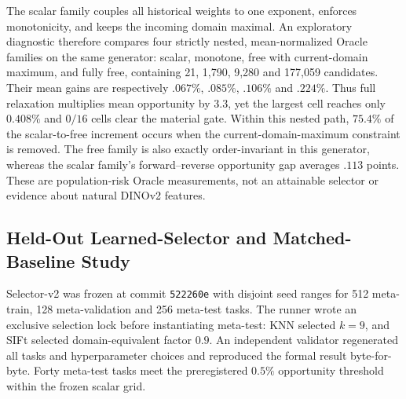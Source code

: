 \documentclass[10pt]{article}
\begin{document}
The scalar family couples all historical weights to one exponent, enforces
monotonicity, and keeps the incoming domain maximal.  An exploratory diagnostic
therefore compares four strictly nested, mean-normalized Oracle families on
the same generator: scalar, monotone, free with current-domain maximum, and
fully free, containing 21, 1{,}790, 9{,}280 and 177{,}059 candidates.  Their
mean gains are respectively $.067\%$, $.085\%$, $.106\%$ and $.224\%$.  Thus
full relaxation multiplies mean opportunity by $3.3$, yet
the largest cell reaches only $0.408\%$ and $0/16$ cells clear the material
gate.  Within this nested path, $75.4\%$ of the scalar-to-free increment occurs
when the current-domain-maximum constraint is removed.  The free family is
also exactly order-invariant in this generator, whereas the scalar family's
forward--reverse opportunity gap averages $.113$ points.  These are
population-risk Oracle measurements, not an attainable selector or evidence
about natural DINOv2 features.

\subsection{Held-Out Learned-Selector and Matched-Baseline Study}
\label{sec:selector-v2-results}

Selector-v2 was frozen at commit \texttt{522260e} with disjoint seed ranges
for 512 meta-train, 128 meta-validation and 256 meta-test tasks. The runner
wrote an exclusive selection lock before instantiating meta-test: KNN selected
$k=9$, and SIFt selected domain-equivalent factor $0.9$. An independent
validator regenerated all tasks and hyperparameter choices and reproduced the
formal result byte-for-byte. Forty meta-test tasks meet the preregistered
$0.5\%$ opportunity threshold within the frozen scalar grid.
\end{document}
